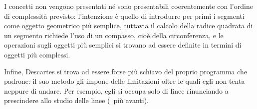 \par I concetti non vengono presentati n\'e sono presentabili coerentemente con l'ordine di complessit\`a previsto: l'intenzione \`e quello di introdurre per primi i segmenti come oggetto geometrico pi\`u semplice, tuttavia il calcolo della radice quadrata di un segmento richiede l'uso di un compasso, cio\`e della circonferenza, e le operazioni sugli oggetti pi\`u semplici si trovano ad essere definite in termini di oggetti pi\`u complessi.
\par Infine, Descartes si trova ad essere forse pi\`u schiavo del proprio programma che padrone: il suo metodo gli impone delle limitazioni oltre le quali egli non tenta neppure di andare. Per esempio, egli si occupa solo di linee  rinunciando a prescindere allo studio delle linee  (\Cfr\ pi\`u avanti).
